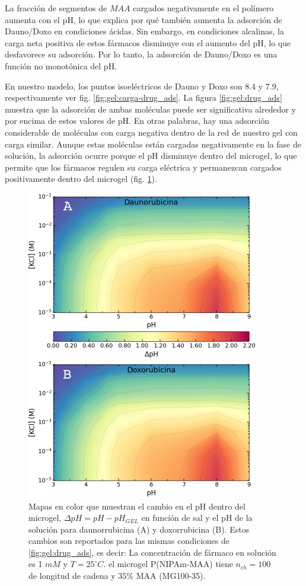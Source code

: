 La fracci\'on de segmentos de $MAA$ cargados negativamente en el pol\'imero aumenta con el pH, lo que explica por qu\'e tambi\'en aumenta la adsorci\'on de Dauno/Doxo en condiciones \'acidas. Sin embargo, en condiciones alcalinas, la carga neta positiva de estos f\'armacos disminuye con el aumento del pH, lo que desfavorece su adsorci\'on. Por lo tanto, la adsorci\'on de Dauno/Doxo es una funci\'on no monot\'onica del pH.

En nuestro modelo, los puntos isoel\'ectricos de Dauno y Doxo son 8.4 y 7.9, respectivamente ver fig. \ref{fig:gel:carga-drug_ads}. La figura \ref{fig:gel:drug_ads} muestra que la adsorci\'on de ambas mol\'eculas puede ser significativa alrededor y por encima de estos valores de pH. En otras palabras, hay una adsorci\'on considerable de mol\'eculas con carga negativa dentro de la red de nuestro gel con carga similar. Aunque estas mol\'eculas est\'an cargadas negativamente en la fase de soluci\'on, la adsorci\'on ocurre porque el pH disminuye dentro del microgel, lo que permite que los f\'armacos regulen su carga el\'ectrica y permanezcan cargados positivamente dentro del microgel (fig. \ref{fig:gel:drug_pH}).


\begin{figure}[!tb]
	\centering
	\includegraphics[width=0.50\linewidth]{Figures/graph-gel/drug_pH.pdf}
	\caption{Mapas en color que muestran el cambio en el pH dentro del microgel, $\Delta pH = pH - pH_{GEL}$ en funci\'on de sal y el pH de la soluci\'on para daunorrubicina (A) y doxorrubicina (B). Estos cambios son reportados para las mismas condiciones de \ref{fig:gel:drug_ads}, es decir:
		La concentraci\'on de f\'armaco en soluci\'on es 1 $mM$ y $T=25 ^\circ C$.
		el microgel P(NIPAm-MAA) tiene $n_{ch}=100$ de longitud de cadena y $35\%$ MAA (MG100-35).}
	\label{fig:gel:drug_pH}
\end{figure}


